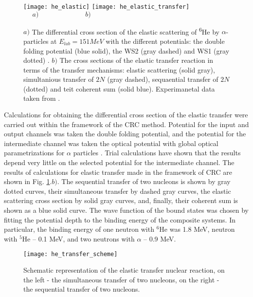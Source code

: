 \documentclass[
12pt, %
oneside, %
english, %
onehalfspacing, %
onehalfspacing, %
headsepline, %
]{MastersDoctoralThesis} %
\newcommand{\he}{\textsuperscript{6}He\xspace}
\begin{document}
\begin{figure}
\centering
\texttt{[image: he\_elastic]}
\texttt{[image: he\_elastic\_transfer]} \\
$~~~~~~a)~~~~~~~~~~~~~~~~~~~~~~~~~~~~~~~b)$
\decoRule
\caption{  \footnotesize  $a)$ The differential cross section of the elastic scattering of \he by $\alpha$-particles at $E_{lab}=151MeV$ with the different potentials: the double folding potential (blue solid), the WS2  (gray dashed) \cite{oganessian1999dynamics} and  WS1 (gray dotted) \cite{oganessian1999dynamics}. $b)$ The cross sections of the elastic transfer reaction in terms of the transfer mechanisms: elastic scattering (solid gray), simultanious transfer of $2N$ (gray dashed), sequaential transfer of $2N$ (dotted) and teit coherent sum (solid blue). Experimanetal data taken from \cite{oganessian1999dynamics}.
}
\label{he_elastic}
\end{figure}

Calculations for obtaining the differential cross section of the elastic transfer were carried out within the framework of the CRC method. Potential for the input and output channels was taken the double folding potential, and the potential for the intermediate channel was taken the optical potential with global optical parametrizations for $\alpha$ particles \cite{avrigeanu1994global}. Trial calculations have shown that the results depend very little on the selected potential for the intermediate channel.
The results of calculations for elastic transfer made in the framework of CRC are shown in Fig. \ref{he_elastic}.$b)$. 
The sequential transfer of two nucleons is shown by gray dotted curves, their simultaneous transfer by dashed gray curves, the elastic scattering cross section by solid gray curves, and, finally, their coherent sum is shown as a blue solid curve. 
The wave function of the bound states was chosen by fitting the potential depth to the binding energy of the composite systems. 
In particular, the binding energy of one neutron with $^6$He was 1.8 MeV,  neutron with $^5$He -- 0.1 MeV, and two neutrons with  $\alpha$  -- 0.9 MeV. 

\begin{figure}[tp]
\centering
\texttt{[image: he\_transfer\_scheme]}
\decoRule
\caption{  \footnotesize  Schematic representation of the elastic transfer nuclear reaction, on the left - the simultaneous transfer of two nucleons, on the right - the sequential transfer of two nucleons.
}
\label{he_transfer_scheme}
\end{figure}
\end{document}

